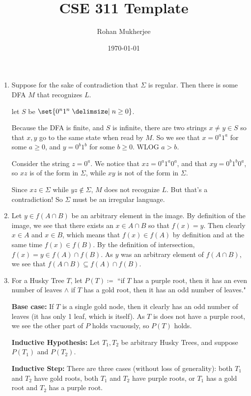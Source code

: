 \documentclass[12pt]{article}
\title{CSE 311 Template}
\date{\today}
\author{Rohan Mukherjee}
\theoremstyle{definition}
\theoremstyle{remark}
\newcommand\setItemnumber[1]{\setcounter{enumi}{\numexpr#1-1\relax}}
\begin{document}
	\maketitle
	\begin{enumerate}[leftmargin=\labelsep]
		\item Suppose for the sake of contradiction that $\Sigma$ is regular. Then there is some DFA $M$ that recognizes $L$.
		
		let $S$ be $\set{0^n1^n \given n \geq 0}$. 
		
		Because the DFA is finite, and $S$ is infinite, there are two strings $x \neq y \in S$ so that $x, y$ go to the same state when read by $M$. So we see that $x = 0^a1^a$ for some $a \geq 0$, and $y = 0^b1^b$ for some $b \geq 0$. WLOG $a > b$. 
		
		Consider the string $z = 0^a$. We notice that $xz = 0^a1^a0^a$, and that $xy = 0^b1^b0^a$, so $xz$ is of the form in $\Sigma$, while $xy$ is not of the form in $\Sigma$.
		
		Since $xz \in \Sigma$ while $yz \not \in \Sigma$, $M$ does not recognize $L$. But that's a contradiction! So $\Sigma$ must be an irregular language.
		
		\setItemnumber{6}
		\item Let $y \in f(A \cap B)$ be an arbitrary element in the image. By definition of the image, we see that there exists an $x \in A \cap B$ so that $f(x) = y$. Then clearly $x \in A$ and $x \in B$, which means that $f(x) \in f(A)$ by definition and at the same time $f(x) \in f(B)$. By the definition of intersection, $f(x) = y \in f(A) \cap f(B)$. As $y$ was an arbitrary element of $f(A \cap B)$, we see that $f(A \cap B) \subseteq f(A) \cap f(B)$.
		
		\item For a Husky Tree $T$, let $P(T) \coloneq $ ``if $T$ has a purple root, then it has an even number of leaves $\land$ if $T$ has a gold root, then it has an odd number of leaves."
		
		\textbf{Base case:} If $T$ is a single gold node, then it clearly has an odd number of leaves (it has only 1 leaf, which is itself). As $T$ is does not have a purple root, we see the other part of $P$ holds vacuously, so $P(T)$ holds.
		
		\textbf{Inductive Hypothesis:} Let $T_1, T_2$ be arbitrary Husky Trees, and suppose $P(T_1)$ and $P(T_2)$.
		
		\textbf{Inductive Step:} There are three cases (without loss of generality): both $T_1$ and $T_2$ have gold roots, both $T_1$ and $T_2$ have purple roots, or $T_1$ has a gold root and $T_2$ has a purple root.
		

\end{enumerate}
\end{document}
